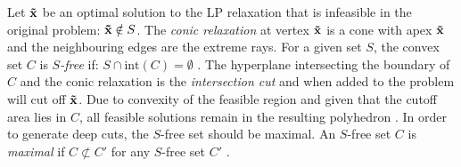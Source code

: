 
Let $\bold{\tilde x}$ be an optimal solution to the LP relaxation that is infeasible in the original problem: $\bold{\tilde x} \notin S$. %
The \textit{conic relaxation} at vertex $\bold{\tilde x}$ is a cone with apex $\bold{\tilde x}$ and the neighbouring edges are the extreme rays. For a given set $S$, the convex set $C$ is \textit{$S$-free} if: $S \cap \text{int}(C) = \emptyset$ \cite{bienstock_outer_product_free_sets}. 
The hyperplane intersecting the boundary of $C$ and the conic relaxation is the \textit{intersection cut} and when added to the problem will cut off $\bold{\tilde x}$. Due to convexity of the feasible region and given that the cutoff area lies in $C$, all feasible solutions remain in the resulting polyhedron %
\cite{musalem_intersection_cuts}.
In order to generate deep cuts, the $S$-free set should be maximal. An $S$-free set $C$ is \textit{maximal} if $C \not \subset C'$ for any $S$-free set $C'$ \cite{bienstock_outer_product_free_sets}.

